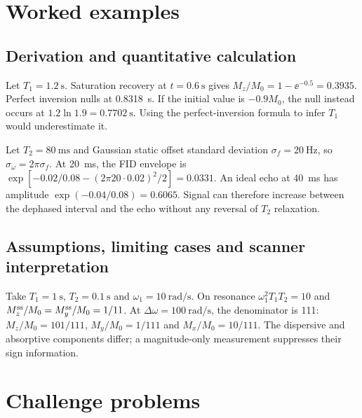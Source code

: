 \section{Worked examples}
\label{sec:03:worked-examples}
\subsection{Derivation and quantitative calculation}
\begin{workedexample}
Let $T_1=\SI{1.2}{\second}$. Saturation recovery at
$t=\SI{0.6}{\second}$ gives $M_z/M_0=1-\ee^{-0.5}=0.3935$.
Perfect inversion nulls at \SI{0.8318}{\second}.
If the initial value is $-0.9M_0$, the null instead occurs at
$1.2\ln1.9=\SI{0.7702}{\second}$. Using the perfect-inversion formula
to infer $T_1$ would underestimate it.
\end{workedexample}
\begin{workedexample}
Let $T_2=\SI{80}{\milli\second}$ and Gaussian static offset standard
deviation $\sigma_f=\SI{20}{\hertz}$, so $\sigma_\omega=2\pi\sigma_f$.
At \SI{20}{\milli\second}, the FID envelope is
$\exp[-0.02/0.08-(2\pi20\cdot0.02)^2/2]=0.0331$.
An ideal echo at \SI{40}{\milli\second} has amplitude
$\exp(-0.04/0.08)=0.6065$.
Signal can therefore increase between the dephased interval and the echo
without any reversal of $T_2$ relaxation.
\end{workedexample}
\subsection{Assumptions, limiting cases and scanner interpretation}
\begin{workedexample}
Take $T_1=\SI{1}{\second}$, $T_2=\SI{0.1}{\second}$ and
$\omega_1=\SI{10}{\radian\per\second}$.
On resonance $\omega_1^2T_1T_2=10$ and
$M_z^{\rm ss}/M_0=M_y^{\rm ss}/M_0=1/11$.
At $\Delta\omega=\SI{100}{\radian\per\second}$,
the denominator is 111:
$M_z/M_0=101/111$, $M_y/M_0=1/111$ and $M_x/M_0=10/111$.
The dispersive and absorptive components differ; a magnitude-only
measurement suppresses their sign information.
\end{workedexample}

\section{Challenge problems}
\label{sec:03:challenge-problems}
